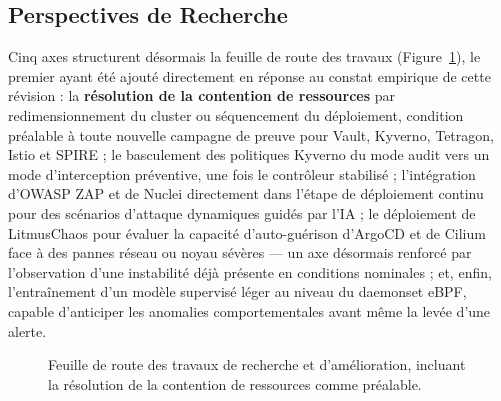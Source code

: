 \subsection{Perspectives de Recherche}

Cinq axes structurent désormais la feuille de route des travaux (Figure~\ref{fig:perspectives_amelioration_full_sec}), le premier ayant été ajouté directement en réponse au constat empirique de cette révision : la \textbf{résolution de la contention de ressources} par redimensionnement du cluster ou séquencement du déploiement, condition préalable à toute nouvelle campagne de preuve pour Vault, Kyverno, Tetragon, Istio et SPIRE ; le basculement des politiques Kyverno du mode audit vers un mode d'interception préventive, une fois le contrôleur stabilisé ; l'intégration d'OWASP ZAP et de Nuclei directement dans l'étape de déploiement continu pour des scénarios d'attaque dynamiques guidés par l'IA ; le déploiement de LitmusChaos pour évaluer la capacité d'auto-guérison d'ArgoCD et de Cilium face à des pannes réseau ou noyau sévères — un axe désormais renforcé par l'observation d'une instabilité déjà présente en conditions nominales ; et, enfin, l'entraînement d'un modèle supervisé léger au niveau du daemonset eBPF, capable d'anticiper les anomalies comportementales avant même la levée d'une alerte.

\begin{figure}[H]
\centering
\scriptsize
{}
\caption{Feuille de route des travaux de recherche et d'amélioration, incluant la résolution de la contention de ressources comme préalable.}
\label{fig:perspectives_amelioration_full_sec}
\end{figure}

